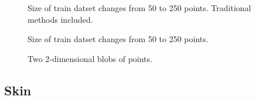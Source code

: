 \documentclass[a4paper]{article}
\begin{document}
\begin{figure}[h]
\begin{minipage}[c]{0.49\linewidth}
 Size of train datset changes from 50 to 250 points. Traditional methods included.
\end{minipage}
\vfill
\begin{minipage}[c]{0.49\linewidth}
 Size of train datset changes from 50 to 250 points.
\end{minipage}
\caption{Two 2-dimensional blobs of points.}
\label{TwoDimacc}
\end{figure}

\clearpage
\subsection{Skin}
\end{document}
